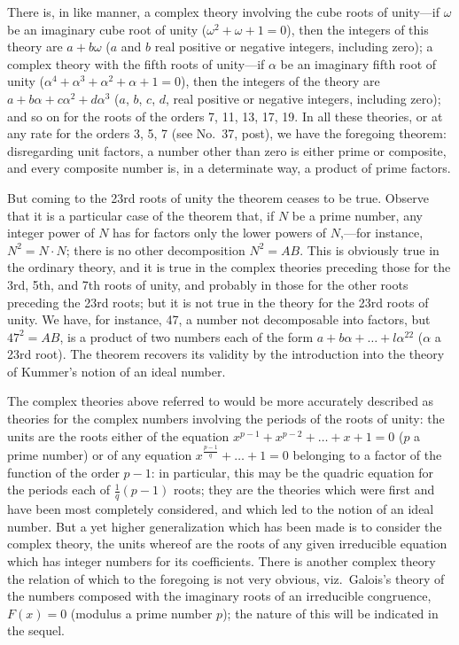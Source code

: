 \documentclass[11pt,a4paper]{article}
\begin{document}
There is, in like manner, a complex theory involving the cube roots of unity---if $\omega$ be an imaginary cube root of unity ($\omega^{2} + \omega + 1 = 0$), then the integers of this theory are $a + b\omega$ ($a$ and $b$ real positive or negative integers, including zero); a complex theory with the fifth roots of unity---if $\alpha$ be an imaginary fifth root of unity ($\alpha^{4} + \alpha^{3} + \alpha^{2} + \alpha + 1 = 0$), then the integers of the theory are $a + b\alpha + c\alpha^{2} + d\alpha^{3}$ ($a$, $b$, $c$, $d$, real positive or negative integers, including zero); and so on for the roots of the orders 7, 11, 13, 17, 19. In all these theories, or at any rate for the orders 3, 5, 7 (see No.~37, post), we have the foregoing theorem: disregarding unit factors, a number other than zero is either prime or composite, and every composite number is, in a determinate way, a product of prime factors.

But coming to the 23rd roots of unity the theorem ceases to be true. Observe that it is a particular case of the theorem that, if $N$ be a prime number, any integer power of $N$ has for factors only the lower powers of $N$,---for instance, $N^{2} = N \cdot N$; there is no other decomposition $N^{2} = AB$. This is obviously true in the ordinary theory, and it is true in the complex theories preceding those for the 3rd, 5th, and 7th roots of unity, and probably in those for the other roots preceding the 23rd roots; but it is not true in the theory for the 23rd roots of unity. We have, for instance, 47, a number not decomposable into factors, but $47^{2} = AB$, is a product of two numbers each of the form $a + b\alpha + \ldots + l\alpha^{22}$ ($\alpha$ a 23rd root). The theorem recovers its validity by the introduction into the theory of Kummer's notion of an ideal number.

The complex theories above referred to would be more accurately described as theories for the complex numbers involving the periods of the roots of unity: the units are the roots either of the equation $x^{p-1} + x^{p-2} + \ldots + x + 1 = 0$ ($p$ a prime number) or of any equation $x^{\frac{p-1}{q}} + \ldots + 1 = 0$ belonging to a factor of the function of the order $p - 1$: in particular, this may be the quadric equation for the periods each of $\frac{1}{q}(p - 1)$ roots; they are the theories which were first and have been most completely considered, and which led to the notion of an ideal number. But a yet higher generalization which has been made is to consider the complex theory, the units whereof are the roots of any given irreducible equation which has integer numbers for its coefficients. There is another complex theory the relation of which to the foregoing is not very obvious, viz.\ Galois's theory of the numbers composed with the imaginary roots of an irreducible congruence, $F(x) = 0$ (modulus a prime number $p$); the nature of this will be indicated in the sequel.
\end{document}
